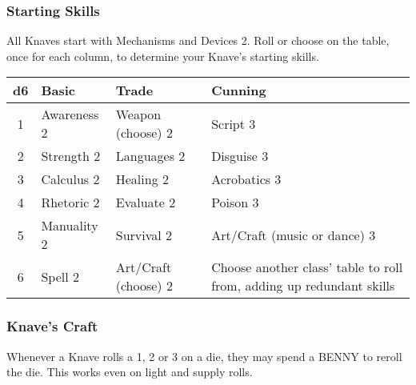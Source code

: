 \begin{multicols}{2}
\subsubsection*{Starting Skills}
All Knaves start with Mechanisms and Devices 2. Roll or choose on the table, once for each column, to determine your Knave's starting skills.
\begin{adjustbox}{width=0.85\columnwidth,center}
\begin{tabularx}{\columnwidth}{|c|p{}|p{}|p{}|}
\hline
\textbf{d6} & \textbf{Basic} & \textbf{Trade} & \textbf{Cunning} \\
\hline
1 & Awareness 2 & Weapon (choose) 2 & Script 3 \\
\hline
2 & Strength 2 & Languages 2 & Disguise 3 \\
\hline
3 & Calculus 2 & Healing 2 & Acrobatics 3 \\
\hline
4 & Rhetoric 2 & Evaluate 2 & Poison 3 \\
\hline
5 & Manuality 2 & Survival 2 & Art/Craft (music or dance) 3 \\
\hline
6 & Spell 2 & Art/Craft (choose) 2 & Choose another class' table to roll from, adding up redundant skills \\
\hline
\end{tabularx}
\end{adjustbox}

\subsubsection*{Knave's Craft}
Whenever a Knave rolls a 1, 2 or 3 on a die, they may spend a BENNY to reroll the die. This works even on light and supply rolls.

\end{multicols}

